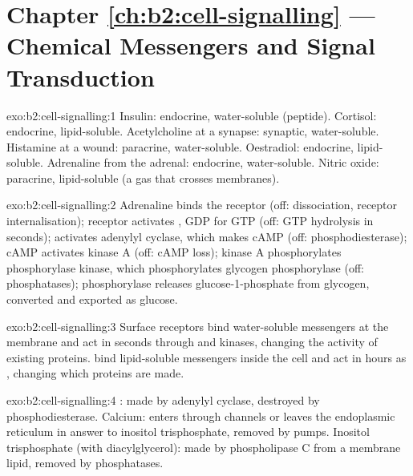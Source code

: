 \section*{Chapter \ref{ch:b2:cell-signalling} --- Chemical Messengers and Signal Transduction}

\begin{solution}{exo:b2:cell-signalling:1}
Insulin: endocrine, water-soluble (peptide). Cortisol: endocrine,
lipid-soluble. Acetylcholine at a synapse: synaptic, water-soluble.
Histamine at a wound: paracrine, water-soluble. Oestradiol:
endocrine, lipid-soluble. Adrenaline from the adrenal: endocrine,
water-soluble. Nitric oxide: paracrine, lipid-soluble (a gas that
crosses membranes).
\end{solution}

\begin{solution}{exo:b2:cell-signalling:2}
Adrenaline binds the receptor (off: dissociation, receptor
internalisation); receptor activates , GDP for GTP (off:
GTP hydrolysis in seconds);  activates adenylyl cyclase,
which makes cAMP (off: phosphodiesterase); cAMP activates kinase A
(off: cAMP loss); kinase A phosphorylates phosphorylase kinase,
which phosphorylates glycogen phosphorylase (off: phosphatases);
phosphorylase releases glucose-1-phosphate from glycogen, converted
and exported as glucose.
\end{solution}

\begin{solution}{exo:b2:cell-signalling:3}
Surface receptors bind water-soluble messengers at the membrane and
act in seconds through  and kinases, changing the
activity of existing proteins.  bind lipid-soluble
messengers inside the cell and act in hours as , changing which proteins are made.
\end{solution}

\begin{solution}{exo:b2:cell-signalling:4}
: made by adenylyl cyclase, destroyed by
phosphodiesterase. Calcium: enters through channels or leaves the
endoplasmic reticulum in answer to inositol trisphosphate, removed
by pumps. Inositol trisphosphate (with diacylglycerol): made by
phospholipase C from a membrane lipid, removed by phosphatases.
\end{solution}

